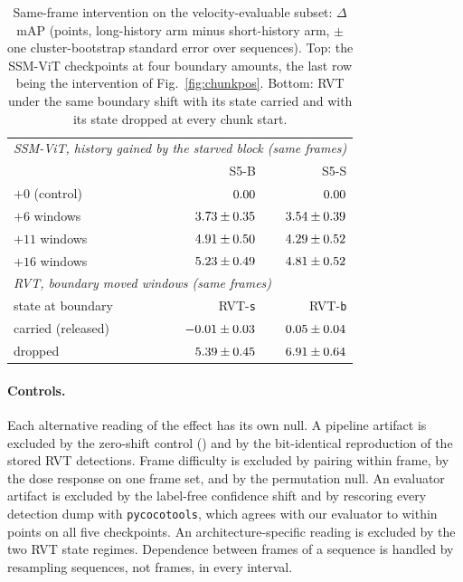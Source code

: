 \documentclass[10pt,twocolumn,letterpaper]{article}
\begin{document}
\begin{table}[t]
\centering\footnotesize
\setlength{\tabcolsep}{3.0pt}\renewcommand{\arraystretch}{0.95}
\begin{tabular}{llrr}
\toprule
\multicolumn{4}{l}{\textit{SSM-ViT, history gained by the starved block (same \ssmDoseN{} frames)}}\\
 & & S5-B & S5-S \\
\midrule
$+0$ (control) & & $0.00$ & $0.00$ \\
$+6$ windows & & $3.73\pm0.35$ & $3.54\pm0.39$ \\
$+11$ windows & & $4.91\pm0.50$ & $4.29\pm0.52$ \\
$+16$ windows & & $5.23\pm0.49$ & $4.81\pm0.52$ \\
\midrule
\multicolumn{4}{l}{\textit{RVT, boundary moved \rvtBoundShift{} windows (same \rvtBoundN{} frames)}}\\
state at boundary & & RVT-\texttt{s} & RVT-\texttt{b} \\
\midrule
carried (released) & & $-0.01\pm0.03$ & $0.05\pm0.04$ \\
dropped & & $5.39\pm0.45$ & $6.91\pm0.64$ \\
\bottomrule
\end{tabular}
\caption{Same-frame intervention on the velocity-evaluable subset: $\Delta$mAP (points, long-history arm minus short-history arm, $\pm$ one cluster-bootstrap standard error over \outSeqsScanned{} sequences). Top: the SSM-ViT checkpoints at four boundary amounts, the last row being the intervention of Fig.~\ref{fig:chunkpos}. Bottom: RVT under the same boundary shift with its state carried and with its state dropped at every chunk start.}
\label{tab:evidence}
\end{table}

\paragraph{Controls.}
Each alternative reading of the effect has its own null. A pipeline artifact is excluded by the zero-shift control (\ssmDoseNull{}) and by the bit-identical reproduction of the stored RVT detections. Frame difficulty is excluded by pairing within frame, by the dose response on one frame set, and by the permutation null. An evaluator artifact is excluded by the label-free confidence shift and by rescoring every detection dump with \texttt{pycocotools}, which agrees with our evaluator to within \portEvalGap{} points on all five checkpoints. An architecture-specific reading is excluded by the two RVT state regimes. Dependence between frames of a sequence is handled by resampling sequences, not frames, in every interval.
\end{document}
